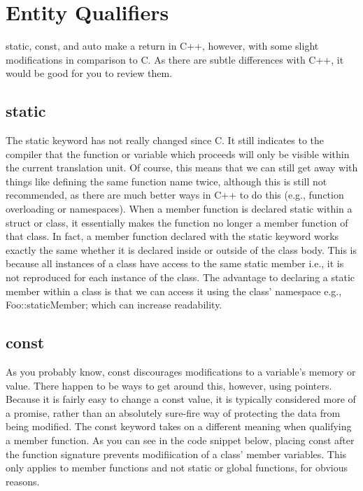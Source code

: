 \documentclass{article}
\begin{document}
\section{Entity Qualifiers}

static, const, and auto make a return in C++, however, with some slight modifications in comparison to C. As
there are subtle differences with C++, it would be good for you to review them.

\subsection{static}

The static keyword has not really changed since C. It still indicates to the compiler that the function or
variable which proceeds will only be visible within the current translation unit. Of course, this means that
we can still get away with things like defining the same function name twice, although this is still not
recommended, as there are much better ways in C++ to do this (e.g., function overloading or namespaces). When
a member function is declared static within a struct or class, it essentially makes the function no longer a
member function of that class. In fact, a member function declared with the static keyword works exactly the
same whether it is declared inside or outside of the class body. This is because all instances of a class
have access to the same static member i.e., it is not reproduced for each instance of the class. The advantage
to declaring a static member within a class is that we can access it using the class' namespace e.g.,
Foo::staticMember; which can increase readability.

\subsection{const}

As you probably know, const discourages modifications to a variable's memory or value. There happen to be
ways to get around this, however, using pointers. Because it is fairly easy to change a const value, it is
typically considered more of a promise, rather than an absolutely sure-fire way of protecting the data from
being modified. The const keyword takes on a different meaning when qualifying a member function. As you can
see in the code snippet below, placing const after the function signature prevents modifiication of a class'
member variables. This only applies to member functions and not static or global functions, for obvious
reasons.
\end{document}
